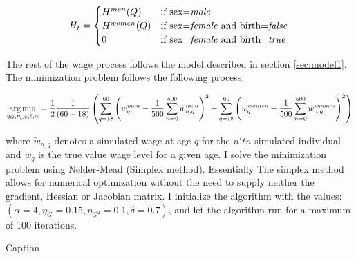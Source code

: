 \begin{equation}
    H_t = \begin{cases}
        H^{men}(Q) & \text{if sex=\textit{male}} \\
        H^{women}(Q) & \text{if sex=\textit{female} and birth=\textit{false}} \\
        0 & \text{if sex=\textit{female} and birth=\textit{true} }\\
    \end{cases}    
\end{equation}

The rest of the wage process follows the model described in section \ref{sec:model1}. The minimization problem follows the following process:

\begin{equation}
    \underset{\eta_G, \eta_{G^2}, \delta, \alpha}{\operatorname*{arg\,min}} = \frac{1}{2}\frac{1}{(60 - 18)} \left( \sum_{q=18}^{60} \left( w^{men}_{q} - \frac{1}{500}\sum_{n=0}^{500}\tilde{w}^{men}_{n,q} \right) ^2 + \sum_{q=18}^{60} \left( w^{women}_{q} - \frac{1}{500}\sum_{n=0}^{500}\tilde{w}^{women}_{n,q} \right) ^2 \right)
\end{equation}

where $\tilde{w}_{n, q}$ denotes a simulated wage at age $q$ for the $n'tn$ simulated individual and $w_q$ is the true value wage level for a given age. I solve the minimization problem using Nelder-Mead (Simplex method). Essentially The simplex method allows for numerical optimization without the need to supply neither the gradient, Hessian or Jacobian matrix. I initialize the algorithm with the values: $(\alpha=4, \eta_G = 0.15, \eta_{G^2}=0.1, \delta=0.7)$, and let the algorithm run for a maximum of 100 iterations. 

\begin{table}[ht]
    \centering
    
    \caption{Caption}
    \label{tab:my_label}
\end{table}